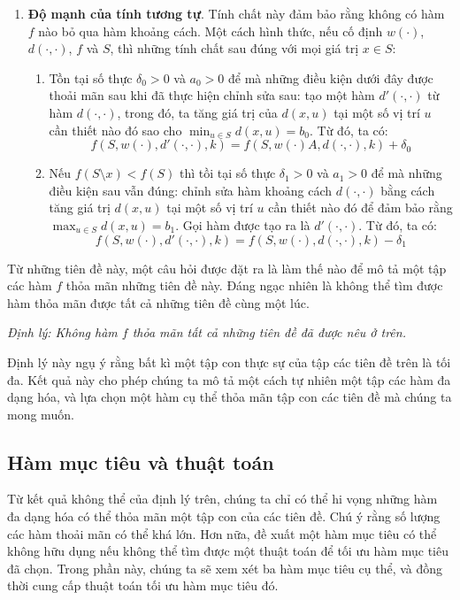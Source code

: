\documentclass[12pt]{report}
\begin{document}
\begin{enumerate}
    \item \textbf{Độ mạnh của tính tương tự}. Tính chất này đảm bảo rằng 
        không có hàm $f$ nào bỏ qua hàm khoảng cách. Một cách hình thức, 
        nếu cố định $w(\cdot)$, $d(\cdot, \cdot)$, $f$ và $S$, thì những 
        tính chất sau đúng với mọi giá trị $x \in S$:
        \begin{enumerate}
            \item Tồn tại số thực $\delta_0 > 0$ 
                và $a_0 > 0$ để mà những điều
                kiện dưới đây được thoải mãn sau khi đã thực hiện chỉnh 
                sửa sau: tạo một hàm 
                $d'(\cdot, \cdot)$ từ hàm $d(\cdot, \cdot)$, 
                trong đó, ta tăng giá trị của 
                $d(x, u)$ tại một số vị trí 
                $u$ cần thiết nào đó sao cho 
                $\min_{u \in S} d(x, u) = b_0$. 
                Từ đó, ta có: 
                $$
                f(S, w(\cdot), d'(\cdot, \cdot), k) =
                f(S, w(\cdot)A, d(\cdot, \cdot), k) + \delta_0
                $$
            \item Nếu $f(S \setminus {x}) < f(S)$ thì tồi tại số thực 
                $\delta_1 > 0$ và $a_1 > 0$ để mà những điều kiện sau vẫn 
                đúng: chỉnh sửa hàm khoảng cách $d(\cdot, \cdot)$
                bằng cách tăng giá trị $d(x, u)$ tại một số 
                vị trí $u$ cần thiết nào đó để đảm bảo rằng 
                $\max_{u \in S} d(x, u) = b_1$. Gọi hàm được tạo ra là 
                $d'(\cdot, \cdot)$. Từ đó, ta có: 
                $$
                    f(S, w(\cdot), d'(\cdot, \cdot), k) = 
                    f(S, w(\cdot), d(\cdot, \cdot), k) - \delta_1
                $$
        \end{enumerate}
\end{enumerate}

Từ những tiên đề này, một câu hỏi được đặt ra là làm thế nào để mô tả 
một tập các hàm $f$ thỏa mãn những tiên đề này. Đáng ngạc nhiên là không 
thể tìm được hàm thỏa mãn được tất cả những tiên đề cùng một lúc. 

\textit{Định lý: Không hàm $f$ thỏa mãn tất cả những tiên đề đã được nêu ở trên.}

Định lý này ngụ ý rằng bất kì một tập con thực sự của tập các tiên đề 
trên là tối đa. Kết quả này cho phép chúng ta mô tả một cách tự nhiên một 
tập các hàm đa dạng hóa, và lựa chọn một  hàm cụ thể thỏa mãn tập con các 
tiên đề mà chúng ta mong muốn. 

\subsection{Hàm mục tiêu và thuật toán}
Từ kết quả không thể của định lý trên, chúng ta chỉ có thể hi vọng những 
hàm đa dạng hóa có thể thỏa mãn một tập con của các tiên đề. 
Chú ý rằng số lượng các hàm thoải mãn có thể khá lớn. Hơn nữa, đề xuất một 
hàm mục tiêu có thể không hữu dụng nếu không thể tìm được một thuật toán 
để tối ưu hàm mục tiêu đã chọn. Trong phần này, chúng ta sẽ xem xét 
ba hàm mục tiêu cụ thể, và đồng thời 
cung cấp thuật toán tối ưu hàm mục tiêu đó. 
\end{document}
